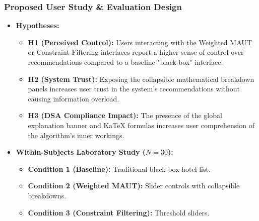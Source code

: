 \PraesentationMasterStandard
\begin{frame}
    \frametitle{Proposed User Study \& Evaluation Design}
    \begin{itemize}
        \item \textbf{Hypotheses:}
            \begin{itemize}
                \item \textbf{H1 (Perceived Control):} Users interacting with the Weighted MAUT or Constraint Filtering interfaces report a higher sense of control over recommendations compared to a baseline "black-box" interface.
                \item \textbf{H2 (System Trust):} Exposing the collapsible mathematical breakdown panels increases user trust in the system's recommendations without causing information overload.
                \item \textbf{H3 (DSA Compliance Impact):} The presence of the global explanation banner and KaTeX formulas increases user comprehension of the algorithm's inner workings.
            \end{itemize}
        \item \textbf{Within-Subjects Laboratory Study ($N=30$):}
            \begin{itemize}
                \item \textbf{Condition 1 (Baseline):} Traditional black-box hotel list.
                \item \textbf{Condition 2 (Weighted MAUT):} Slider controls with collapsible breakdowns.
                \item \textbf{Condition 3 (Constraint Filtering):} Threshold sliders.
            \end{itemize}
    \end{itemize}
\end{frame}



